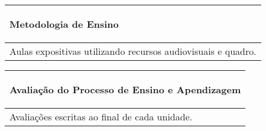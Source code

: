 \begin{table}[h]
\begin{small}
\begin{tabular}{|p{15cm}|}
\end{tabular} 
\end{small}
\label{dadosinstituicao}
\end{table}


\begin{table}[h]
\centering
\begin{small} 
\setlength{\tabcolsep}{3pt} 
\begin{tabular}{|p{15cm}|}\hline

\begin{center}\textbf{Metodologia de Ensino}\end{center}\\ \hline
   Aulas expositivas utilizando recursos audiovisuais e quadro.
 \\ \hline
\end{tabular} 
\end{small}
\label{dadosinstituicao}
\end{table}


\begin{table}[h]
\centering
\begin{small} 
\setlength{\tabcolsep}{3pt} 
\begin{tabular}{|p{15cm}|}\hline

\begin{center}\textbf{Avaliação do Processo de Ensino e Apendizagem}\end{center}\\ \hline
   Avaliações escritas ao final de cada unidade.
 \\ \hline

\end{tabular} 
\end{small}
\label{dadosinstituicao}
\end{table}

